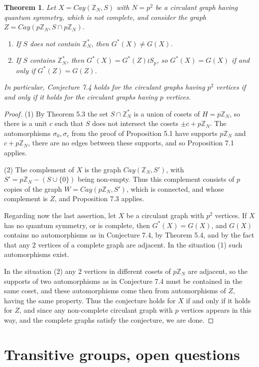 \documentclass[11pt]{amsart}
\newtheorem{theorem}{Theorem}[section]
\newcommand{\Z}{\mathbb Z}
\begin{document}
\begin{theorem}
Let $X=Cay(\Z_N,S)$ with $N=p^2$ be a circulant graph having quantum symmetry, which is not complete, and consider the graph $Z=Cay(p\Z_N,S\cap p\Z_N)$.
\begin{enumerate}
\item If $S$ does not contain $\Z_N^*$, then $G^*(X)\neq G(X)$.
\item If $S$ contains $\Z_N^*$, then $G^*(X)=G^*(Z)\wr S_p$, so $G^*(X)=G(X)$ if and only if $G^*(Z)=G(Z)$.
\end{enumerate}
In particular, Conjecture 7.4 holds for the circulant graphs having $p^2$ vertices if and only if it holds for the circulant graphs having $p$ vertices.
\end{theorem}

\begin{proof}
(1) By Theorem 5.3 the set $S\cap\Z_N^*$ is a union of cosets of $H=p\Z_N$, so there is a unit $c$ such that $S$ does not intersect the cosets $\pm c+p\Z_N$. The automorphisms $\sigma_0,\sigma_c$ from the proof of Proposition 5.1 have supports $p\Z_N$ and $c+p\Z_N$, there are no edges between these supports, and so Proposition 7.1 applies.

(2) The complement of $X$ is the graph $Cay(\Z_N,S')$, with $S'=p\Z_N-(S\cup\{0\})$ being non-empty. Thus this complement consists of $p$ copies of the graph $W=Cay(p\Z_N,S')$, which is connected, and whose complement is $Z$, and Proposition 7.3 applies.

Regarding now the last assertion, let $X$ be a circulant graph with $p^2$ vertices. If $X$ has no quantum symmetry, or is complete, then $G^*(X)=G(X)$, and $G(X)$ contains no automorphisms as in Conjecture 7.4, by Theorem 5.4, and by the fact that any $2$ vertices of a complete graph are adjacent. In the situation (1) such automorphisms exist.

In the situation (2) any $2$ vertices in different cosets of $p\Z_N$ are adjacent, so the supports of two automorphisms as in Conjecture 7.4 must be contained in the same coset, and these automorphisms come then from automorphisms of $Z$, having the same property. Thus the conjecture holds for $X$ if and only if it holds for $Z$, and since any non-complete circulant graph with $p$ vertices appears in this way, and the complete graphs satisfy the conjecture, we are done.
\end{proof}

\section{Transitive groups, open questions}
\end{document}
